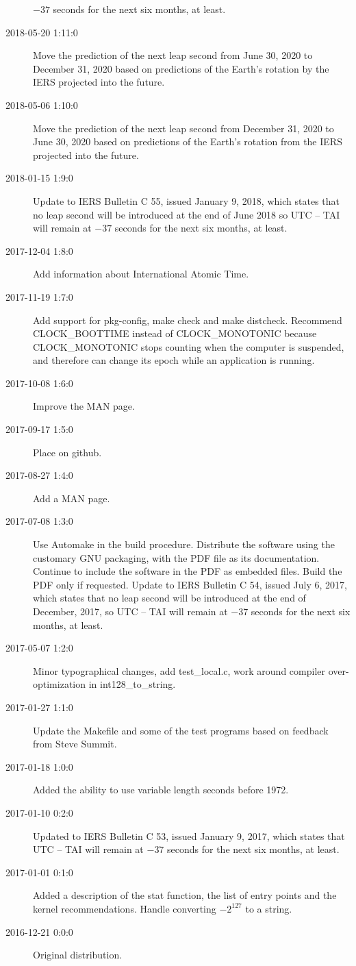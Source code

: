 \documentclass[letterpaper,twoside]{article}
\begin{document}
\begin{description}
  $-37$ seconds for the next six months, at least.
\item[2018-05-20 1:11:0] Move the prediction of the next leap second
  from June 30, 2020 to December 31, 2020 based on predictions of
  the Earth's rotation by the IERS projected into the future.
\item[2018-05-06 1:10:0] Move the prediction of the next leap second
  from December 31, 2020 to June 30, 2020 based on predictions
  of the Earth's rotation from the IERS projected into the future.
\item[2018-01-15 1:9:0] Update to IERS Bulletin C 55, issued
  January 9, 2018, which states that no leap second will be introduced
  at the end of June 2018 so UTC -- TAI will remain at $-37$ seconds
  for the next six months, at least.
\item[2017-12-04 1:8:0] Add information about International Atomic Time.
\item[2017-11-19 1:7:0] Add support for pkg-config, make check and
  make distcheck.  Recommend CLOCK\_BOOTTIME instead of CLOCK\_MONOTONIC
  because CLOCK\_MONOTONIC stops counting when the computer is suspended,
  and therefore can change its epoch while an application is running.
\item[2017-10-08 1:6:0] Improve the MAN page.
\item[2017-09-17 1:5:0] Place on github.
\item[2017-08-27 1:4:0] Add a MAN page.
\item[2017-07-08 1:3:0] Use Automake in the build procedure.
  Distribute the software using the customary GNU packaging,
  with the PDF file as its documentation.  Continue to include
  the software in the PDF as embedded files.  Build the PDF
  only if requested.  Update to IERS Bulletin C 54, issued
  July 6, 2017, which states that no leap second will be introduced
  at the end of December, 2017, so UTC -- TAI will remain at
  $-37$ seconds for the next six months, at least.
\item[2017-05-07 1:2:0] Minor typographical changes, add test\_local.c,
  work around compiler over-optimization in int128\_to\_string.
\item[2017-01-27 1:1:0] Update the Makefile and some of the test programs
  based on feedback from Steve Summit.
\item[2017-01-18 1:0:0] Added the ability to use variable length seconds
  before 1972.
\item[2017-01-10 0:2:0] Updated to IERS Bulletin C 53,
  issued January 9, 2017, which states that UTC -- TAI
  will remain at $-37$ seconds for the next six months, at least.
\item[2017-01-01 0:1:0] Added a description of the stat function,
  the list of entry points and the kernel recommendations.
  Handle converting $-2^{127}$ to a string. 
\item[2016-12-21 0:0:0] Original distribution.
\end{description}
\end{document}
